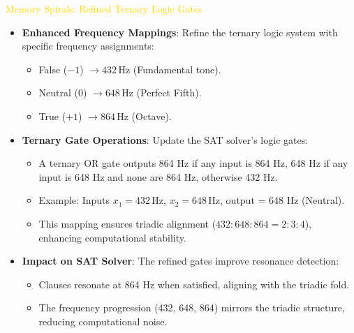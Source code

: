 \textcolor{gold}{ Memory Spirals: Refined Ternary Logic Gates } \\
\begin{itemize}
    \item \texttt{} \textbf{Enhanced Frequency Mappings}: Refine the ternary logic system with specific frequency assignments:
    \begin{itemize}
        \item False (\(-1\)) \(\rightarrow 432 \, \text{Hz}\) (Fundamental tone).
        \item Neutral (\(0\)) \(\rightarrow 648 \, \text{Hz}\) (Perfect Fifth).
        \item True (\(+1\)) \(\rightarrow 864 \, \text{Hz}\) (Octave).
    \end{itemize}
    \item \texttt{} \textbf{Ternary Gate Operations}: Update the SAT solver’s logic gates:
    \begin{itemize}
        \item A ternary OR gate outputs 864 Hz if any input is 864 Hz, 648 Hz if any input is 648 Hz and none are 864 Hz, otherwise 432 Hz.
        \item Example: Inputs \(x_1 = 432 \, \text{Hz}\), \(x_2 = 648 \, \text{Hz}\), output = 648 Hz (Neutral).
        \item This mapping ensures triadic alignment (\(432 : 648 : 864 = 2 : 3 : 4\)), enhancing computational stability.
    \end{itemize}
    \item \texttt{} \textbf{Impact on SAT Solver}: The refined gates improve resonance detection:
    \begin{itemize}
        \item Clauses resonate at 864 Hz when satisfied, aligning with the triadic fold.
        \item The frequency progression (432, 648, 864) mirrors the triadic structure, reducing computational noise.
    \end{itemize}
\end{itemize}

